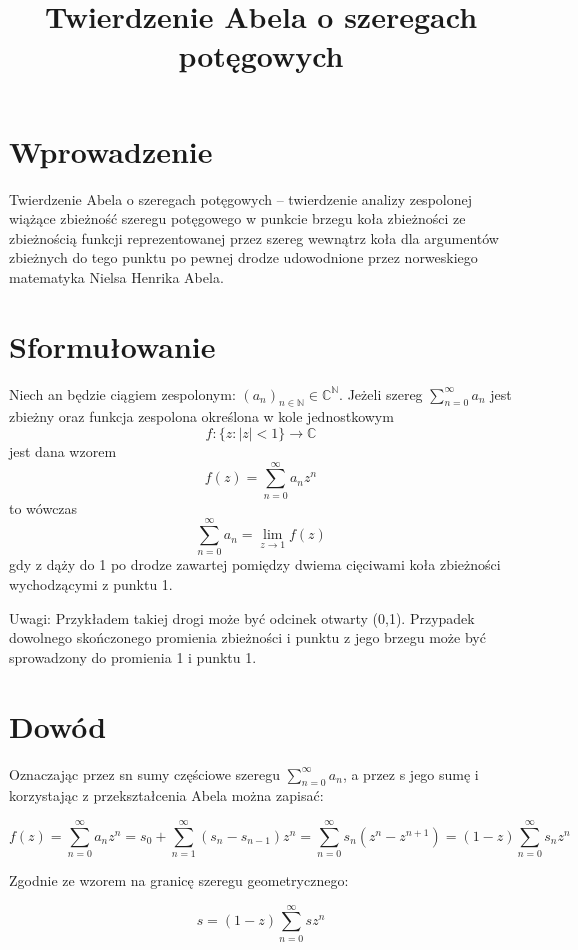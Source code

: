 \documentclass{article}
\begin{document}
\title{Twierdzenie Abela o szeregach potęgowych}
\maketitle

\section*{Wprowadzenie}
Twierdzenie Abela o szeregach potęgowych – twierdzenie analizy zespolonej wiążące zbieżność szeregu potęgowego w punkcie brzegu koła zbieżności ze zbieżnością funkcji reprezentowanej przez szereg wewnątrz koła dla argumentów zbieżnych do tego punktu po pewnej drodze udowodnione przez norweskiego matematyka Nielsa Henrika Abela. 


\section*{Sformułowanie}

Niech an będzie ciągiem zespolonym: \((a_{n})_{n\in \mathbb {N} }\in \mathbb {C} ^{\mathbb {N} }\). Jeżeli szereg $\sum _{n=0}^{\infty }a_{n}$ jest zbieżny oraz funkcja zespolona określona w kole jednostkowym
$$f:\{z:|z|<1\}\to \mathbb {C}$$
jest dana wzorem \[f(z)=\sum _{n=0}^{\infty }a_{n}z^{n}\] 
to wówczas 
$$\sum _{n=0}^{\infty }a_{n}=\lim _{z\to 1}f(z)$$ gdy z dąży do 1 po drodze zawartej pomiędzy dwiema cięciwami koła zbieżności wychodzącymi z punktu 1. 

Uwagi: Przykładem takiej drogi może być odcinek otwarty (0,1). Przypadek dowolnego skończonego promienia zbieżności i punktu z jego brzegu może być sprowadzony do promienia 1 i punktu 1. 

\section*{Dowód}
Oznaczając przez sn sumy częściowe szeregu $ \sum _{n=0}^{\infty }a_{n}$, a przez s jego sumę i korzystając z przekształcenia Abela można zapisać: 

\begin{displaymath}
	f(z)=\sum _{n=0}^{\infty }a_{n}z^{n}=s_{0}+\sum _{n=1}^{\infty }(s_{n}-s_{n-1})z^{n}=\sum _{n=0}^{\infty }s_{n}(z^{n}-z^{n+1})=(1-z)\sum _{n=0}^{\infty }s_{n}z^{n}
\end{displaymath}

Zgodnie ze wzorem na granicę szeregu geometrycznego:

\begin{equation*}
	s=(1-z)\sum _{n=0}^{\infty }sz^{n}
\end{equation*}
\end{document}
